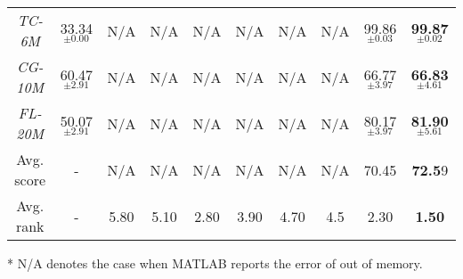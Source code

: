 \begin{table*}[]
{\begin{threeparttable}
\begin{tabular}{@{}c||c||ccccccc|c@{}}
        \emph{TC-6M}     & 33.34$_{\pm 0.00}$    & N/A                & N/A                 & N/A                         & N/A                 & N/A                 & N/A                 & 99.86$_{\pm 0.03}$          & \textbf{99.87$_{\pm 0.02}$} \\
        \emph{CG-10M}    & 60.47$_{\pm 2.91}$    & N/A                & N/A                 & N/A                         & N/A                 & N/A                 & N/A                 & 66.77 $_{\pm 3.97}$         & \textbf{66.83$_{\pm 4.61}$} \\
        \emph{FL-20M}    & 50.07$_{\pm 2.91}$    & N/A                & N/A                 & N/A                         & N/A                 & N/A                 & N/A                 & 80.17 $_{\pm 3.97}$         & \textbf{81.90$_{\pm 5.61}$} \\
        \midrule
        \midrule
        Avg. score       & \multicolumn{1}{c}{-} & N/A                & N/A                 & N/A                         & N/A                 & N/A                 & N/A                 & 70.45                       & \textbf{72.5}9              \\
        \midrule
        \midrule
        Avg. rank        & \multicolumn{1}{c}{-} & 5.80               & 5.10                & 2.80                        & 3.90                & 4.70                & 4.5                 & 2.30                        & \textbf{1.50}               \\
        \bottomrule
      \end{tabular}\begin{tablenotes}
        \item[*] N/A denotes the case when MATLAB reports the error of out of memory.
      \end{tablenotes}
    \end{threeparttable}
  }

\end{table*}



